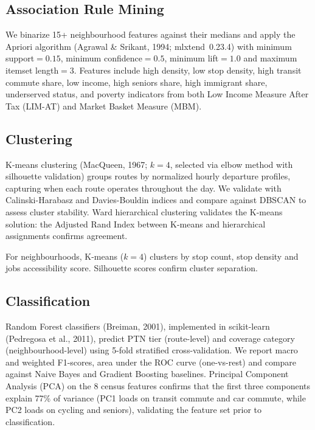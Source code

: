 \documentclass[11pt]{article}
\begin{document}
\subsection{Association Rule Mining}

We binarize 15+ neighbourhood features against their medians and apply the Apriori algorithm (Agrawal \& Srikant, 1994; mlxtend~0.23.4) with minimum support$=0.15$, minimum confidence$=0.5$, minimum lift$=1.0$ and maximum itemset length$=3$. Features include high density, low stop density, high transit commute share, low income, high seniors share, high immigrant share, underserved status, and poverty indicators from both Low Income Measure After Tax (LIM-AT) and Market Basket Measure (MBM).

\subsection{Clustering}

K-means clustering (MacQueen, 1967; $k=4$, selected via elbow method with silhouette validation) groups routes by normalized hourly departure profiles, capturing when each route operates throughout the day. We validate with Calinski-Harabasz and Davies-Bouldin indices and compare against DBSCAN to assess cluster stability. Ward hierarchical clustering validates the K-means solution: the Adjusted Rand Index between K-means and hierarchical assignments confirms agreement.

For neighbourhoods, K-means ($k=4$) clusters by stop count, stop density and jobs accessibility score. Silhouette scores confirm cluster separation.

\subsection{Classification}

Random Forest classifiers (Breiman, 2001), implemented in scikit-learn (Pedregosa et al., 2011), predict PTN tier (route-level) and coverage category (neighbourhood-level) using 5-fold stratified cross-validation. We report macro and weighted F1-scores, area under the ROC curve (one-vs-rest) and compare against Naive Bayes and Gradient Boosting baselines. Principal Component Analysis (PCA) on the 8 census features confirms that the first three components explain 77\% of variance (PC1 loads on transit commute and car commute, while PC2 loads on cycling and seniors), validating the feature set prior to classification.
\end{document}

